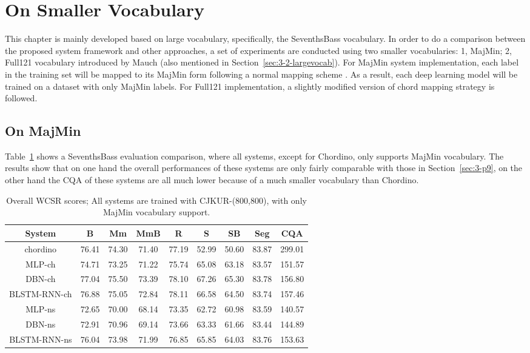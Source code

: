 \section{On Smaller Vocabulary}
This chapter is mainly developed based on large vocabulary, specifically, the SeventhsBass vocabulary. In order to do a comparison between the proposed system framework and other approaches, a set of experiments are conducted using two smaller vocabularies: 1, MajMin; 2, Full121 vocabulary introduced by Mauch \cite{mauch2010automatic} (also mentioned in Section~\ref{sec:3-2-largevocab}). For MajMin system implementation, each label in the training set will be mapped to its MajMin form following a normal mapping scheme \cite{harte2010towards,pauwels2013evaluating}. As a result, each deep learning model will be trained on a dataset with only MajMin labels. For Full121 implementation, a slightly modified version of chord mapping strategy \cite{mauch2010automatic} is followed.

\subsection{On MajMin}
Table~\ref{tab:3-overallres} shows a SeventhsBass evaluation comparison, where all systems, except for Chordino, only supports MajMin vocabulary. The results show that on one hand the overall performances of these systems are only fairly comparable with those in Section~\ref{sec:3-p9}, on the other hand the CQA of these systems are all much lower because of a much smaller vocabulary than Chordino.
\begin{table}[h]
\footnotesize
\centering
\caption{Overall WCSR scores; All systems are trained with CJKUR-(800,800), with only MajMin vocabulary support.}
\label{tab:3-overallres}
\begin{tabular}{|c|c|c|c|c|c|c|c|c|}\hline
System & B & Mm & MmB & R & S & SB & Seg & CQA \\ \hline
chordino & 76.41 & 74.30 & 71.40 & 77.19 & 52.99 & 50.60 & 83.87 & 299.01\\ \hline
MLP-ch & 74.71 & 73.25 & 71.22 & 75.74 & 65.08 & 63.18 & 83.57 & 151.57\\ \hline
DBN-ch & 77.04 & 75.50 & 73.39 & 78.10 & 67.26 & 65.30 & 83.78 & 156.80\\ \hline
BLSTM-RNN-ch & 76.88 & 75.05 & 72.84 & 78.11 & 66.58 & 64.50 & 83.74 & 157.46\\ \hline
MLP-ns & 72.65 & 70.00 & 68.14 & 73.35 & 62.72 & 60.98 & 83.59 & 140.57\\ \hline
DBN-ns & 72.91 & 70.96 & 69.14 & 73.66 & 63.33 & 61.66 & 83.44 & 144.89\\ \hline
BLSTM-RNN-ns & 76.04 & 73.98 & 71.99 & 76.85 & 65.85 & 64.03 & 83.76 & 153.63\\ \hline
\end{tabular}
\end{table}

